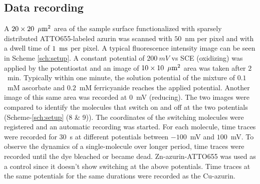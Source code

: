 \subsection{Data recording}
A $20\times20~\,\mu\textrm{m}^2$ area of the sample surface functionalized with sparsely distributed ATTO655-labeled azurin was scanned with $50$~nm per pixel and with a dwell time of $1~\,\textrm{ms}$ per pixel. A typical fluorescence intensity image can be seen in Scheme \ref{sch:setup}. A constant potential of $200~mV$ vs SCE (oxidizing) was applied by the potentiostat and an image of $10\times10~\,\mu\textrm{m}^2$ area was taken after $2$~min. Typically within one minute, the solution potential of the mixture of $0.1$~mM ascorbate and $0.2$~mM ferricyanide reaches the applied potential. Another image of this same area was recorded at $0$~mV (reducing). The two images were compared to identify the molecules that switch on and off at the two potentials (Scheme-\ref{sch:setup} (8 \& 9)). The coordinates of the switching molecules were registered and an automatic recording was started. For each molecule, time traces were recorded for $30$~s at different potentials between $-100$~mV and $100$~mV. To observe the dynamics of a single-molecule over longer period, time traces were recorded until the dye  bleached or became dead. Zn-azurin-ATTO655 was used as a control since it doesn't show switching at the above potentials. Time traces at the same potentials for the same durations were recorded as the Cu-azurin.
